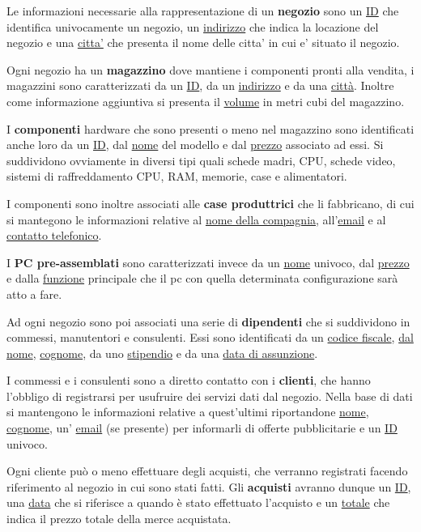 Le informazioni necessarie alla rappresentazione di un \textbf{negozio} sono un \underline{ID} che identifica univocamente un negozio, un \underline{indirizzo} che indica la locazione del negozio e una \underline{citta'} che presenta il nome delle citta' in cui e' situato il negozio.\par
Ogni negozio ha un \textbf{magazzino} dove mantiene i componenti pronti alla vendita, i magazzini sono caratterizzati da un \underline{ID}, da un \underline{indirizzo} e da una \underline{città}. Inoltre come informazione aggiuntiva si presenta il \underline{volume} in metri cubi del magazzino.\par
I \textbf{componenti} hardware che sono presenti o meno nel magazzino sono identificati anche loro da un \underline{ID}, dal \underline{nome} del modello e dal \underline{prezzo} associato ad essi. Si suddividono ovviamente in diversi tipi quali schede madri, CPU, schede video, sistemi di raffreddamento CPU, RAM, memorie, case e alimentatori.\par
I componenti sono inoltre associati alle \textbf{case produttrici} che li fabbricano, di cui si mantegono le informazioni relative al \underline{nome della compagnia}, all'\underline{email} e al \underline{contatto telefonico}.\par
I \textbf{PC pre-assemblati} sono caratterizzati invece da un \underline{nome} univoco, dal \underline{prezzo} e dalla \underline{funzione} principale che il pc con quella determinata configurazione sarà atto a fare.\par
Ad ogni negozio sono poi associati una serie di \textbf{dipendenti} che si suddividono in commessi, manutentori e consulenti. Essi sono identificati da un \underline{codice fiscale}, \underline{dal nome}, \underline{cognome}, da uno \underline{stipendio} e da una \underline{data di assunzione}.\par I commessi e i consulenti sono a diretto contatto con i \textbf{clienti}, che hanno l'obbligo di 			registrarsi per usufruire dei servizi dati dal negozio. Nella base di dati si mantengono le 						informazioni relative a quest'ultimi riportandone \underline{nome}, \underline{cognome}, un' \underline{email} (se presente) per informarli di offerte pubblicitarie e un \underline{ID} univoco.\par
Ogni cliente può o meno effettuare degli acquisti, che verranno registrati facendo riferimento 		al negozio in cui sono stati fatti.
Gli \textbf{acquisti} avranno dunque un \underline{ID}, una \underline{data} che si riferisce a quando è stato effettuato l'acquisto e un \underline{totale} che indica il prezzo totale della merce acquistata.
